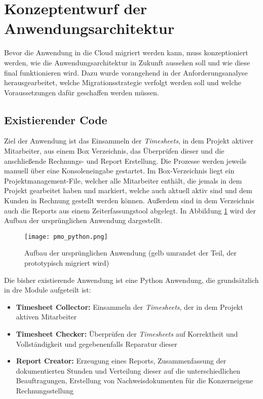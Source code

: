 \section{Konzeptentwurf der Anwendungsarchitektur}
\label{sec:konzeptentwurf}
Bevor die Anwendung in die Cloud migriert werden kann, muss konzeptioniert werden, wie die Anwendungsarchitektur in Zukunft aussehen soll und wie diese final funktionieren wird. Dazu wurde vorangehend in der Anforderungsanalyse herausgearbeitet, welche Migrationsstrategie verfolgt werden soll und welche Voraussetzungen dafür geschaffen werden müssen.

\subsection{Existierender Code}
Ziel der Anwendung ist das Einsammeln der \textit{\glspl{Timesheet}}, in dem Projekt aktiver Mitarbeiter, aus einem \gls{Box} Verzeichnis, das Überprüfen dieser und die anschließende Rechnungs- und Report Erstellung. Die Prozesse werden jeweils manuell über eine Konsoleneingabe gestartet. Im \gls{Box}-Verzeichnis liegt ein Projektmanagement-File, welcher alle Mitarbeiter enthält, die jemals in dem Projekt gearbeitet haben und markiert, welche auch aktuell aktiv sind und dem Kunden in Rechnung gestellt werden können. Außerdem sind in dem Verzeichnis auch die Reports aus einem Zeiterfassungstool abgelegt. In Abbildung \ref{fig:pmo_python} wird der Aufbau der ursprünglichen Anwendung dargestellt.

\begin{figure}[H]
    \centering
    \texttt{[image: pmo\_python.png]}
    \caption{Aufbau der ursprünglichen Anwendung (gelb umrandet der Teil, der prototypisch migriert wird)}
    \label{fig:pmo_python}
\end{figure}

Die bisher existierende Anwendung ist eine Python Anwendung, die grundsätzlich in dre Module aufgeteilt ist:
\begin{itemize}
\item \textbf{Timesheet Collector: }Einsammeln der \textit{\glspl{Timesheet}}, der in dem Projekt aktiven Mitarbeiter
\item \textbf{Timesheet Checker: }Überprüfen der \textit{\glspl{Timesheet}} auf Korrektheit und Vollständigkeit und gegebenenfalls Reparatur dieser
\item \textbf{Report Creator: }Erzeugung eines Reports, Zusammenfassung der dokumentierten Stunden und Verteilung dieser auf die unterschiedlichen Beauftragungen, Erstellung von Nachweisdokumenten für die Konzerneigene Rechnungsstellung
\end{itemize}

